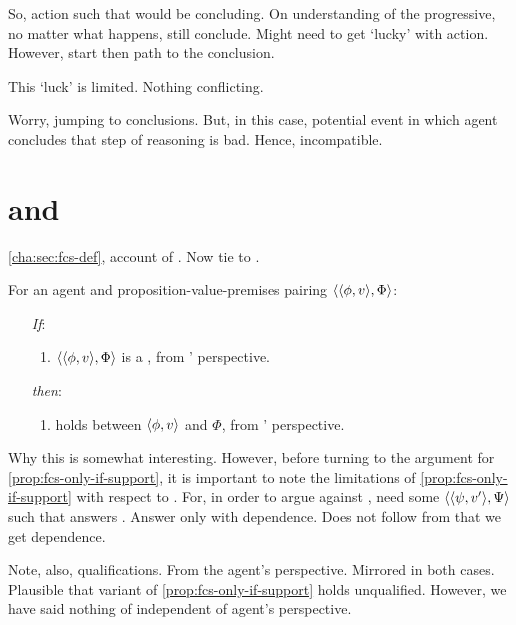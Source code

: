 \begin{note}
  So, action such that would be concluding.
  On understanding of the progressive, no matter what happens, still conclude.
  Might need to get `lucky' with action.
  However, start then path to the conclusion.

  This `luck' is limited.
  Nothing conflicting.
\end{note}

\begin{note}
  Worry, jumping to conclusions.
  But, in this case, potential event in which agent concludes that step of reasoning is bad.
  Hence, incompatible.
\end{note}

\section{ and }
\label{cha:fcs:sec:fcs-support}

\begin{note}
  \autoref{cha:sec:fcs-def}, account of .
  Now tie to .
\end{note}

\begin{note}
  \begin{proposition}
    \label{prop:fcs-only-if-support}
    For an agent \vAgent{} and proposition-value-premises pairing \(\langle \langle \phi, v \rangle, \Phi \rangle\):
    \begin{enumerate}
    \item[\emph{If}:]
      \begin{enumerate}[label=\alph*., ref=(\alph*.)]
      \item
        \(\langle \langle \phi, v \rangle, \Phi \rangle\) is a , from \vAgent{}' perspective.
      \end{enumerate}
    \item[\emph{then}:]
      \begin{enumerate}[label=\alph*., ref=(\alph*.), resume]
      \item
         holds between \(\langle \phi, v \rangle\) and \(\Phi\), from \vAgent{}' perspective.
      \end{enumerate}
    \end{enumerate}
    \vspace{-\baselineskip}
  \end{proposition}

  {
    \color{red}
    Why this is somewhat interesting.
  }
  However, before turning to the argument for \autoref{prop:fcs-only-if-support}, it is important to note the limitations of \autoref{prop:fcs-only-if-support} with respect to \issueConstraint{}.
  For, in order to argue against \issueConstraint{}, need some \(\langle \langle \psi, v' \rangle, \Psi \rangle\) such that answers \qWhyV{}.
  Answer \qWhyV{} only with dependence.
  Does not follow from  that we get dependence.

  Note, also, qualifications.
  From the agent's perspective.
  Mirrored in both cases.
  Plausible that variant of \autoref{prop:fcs-only-if-support} holds unqualified.
  However, we have said nothing of \support{} independent of agent's perspective.
\end{note}

